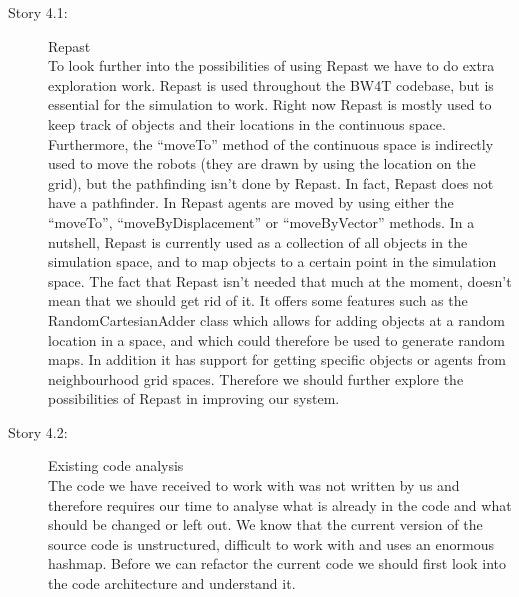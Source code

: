 \begin{description}
\item[Story 4.1:] Repast\\
To look further into the possibilities of using Repast we have to do extra exploration work.
Repast is used throughout the BW4T codebase, but is essential for the simulation to work.
Right now Repast is mostly used to keep track of objects and their locations in the continuous space.
Furthermore, the ``moveTo'' method of the continuous space is indirectly used to move the robots (they are drawn by using the location on the grid), but the pathfinding isn't done by Repast.
In fact, Repast does not have a pathfinder.
In Repast agents are moved by using either the ``moveTo'', ``moveByDisplacement'' or ``moveByVector'' methods.
In a nutshell, Repast is currently used as a collection of all objects in the simulation space, and to map objects to a certain point in the simulation space.
The fact that Repast isn't needed that much at the moment, doesn't mean that we should get rid of it.
It offers some features such as the RandomCartesianAdder class which allows for adding objects at a random location in a space, and which could therefore be used to generate random maps.
In addition it has support for getting specific objects or agents from neighbourhood grid spaces.
Therefore we should further explore the possibilities of Repast in improving our system.
\end{description}

\begin{description}
\item[Story 4.2:] Existing code analysis\\
The code we have received to work with was not written by us and therefore requires our time to analyse what is already in the code and what should be changed or left out.
We know that the current version of the source code is unstructured, difficult to work with and uses an enormous hashmap.
Before we can refactor the current code we should first look into the code architecture and understand it.
\end{description}